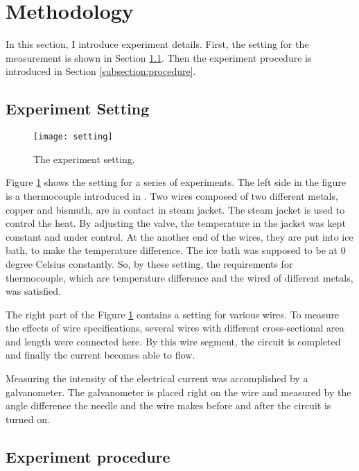 
\section{Methodology}

In this section, I introduce experiment details.
First, the setting for the measurement is shown in Section \ref{subsection:setting}.
Then the experiment procedure is introduced in Section \ref{subsection:procedure}.

\subsection{Experiment Setting}
\label{subsection:setting}

\begin{figure}[!t]
  \centering
  \texttt{[image: setting]}
  \caption{The experiment setting.}
  \label{figure:setting}
\end{figure}

Figure \ref{figure:setting} shows the setting for a series of experiments.
The left side in the figure is a thermocouple introduced in \cite{thermocouple}.
Two wires composed of two different metals, copper and bismuth, are in contact in steam jacket.
The steam jacket is used to control the heat.
By adjusting the valve, the temperature in the jacket was kept constant and under control.
At the another end of the wires, they are put into ice bath, to make the temperature difference.
The ice bath was supposed to be at 0 degree Celsius constantly.
So, by these setting, the requirements for thermocouple, which are temperature difference and the wired of different metals, was satisfied.

The right part of the Figure \ref{figure:setting} contains a setting for various wires.
To measure the effects of wire specifications, several wires with different cross-sectional area and length were connected here.
By this wire segment, the circuit is completed and finally the current becomes able to flow.

Measuring the intensity of the electrical current was accomplished by a galvanometer.
The galvanometer is placed right on the wire and measured by the angle difference the needle and the wire makes before and after the circuit is turned on.

\subsection{Experiment procedure}

